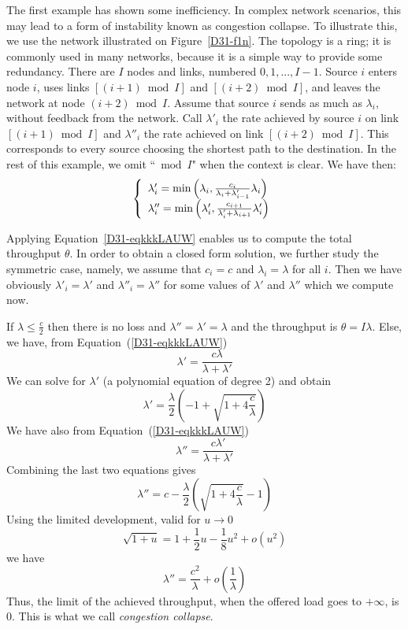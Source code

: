 The first example has shown some inefficiency. In complex
network scenarios, this may lead to a form of instability
known as congestion collapse. To illustrate this, we use the
network illustrated on Figure~\ref{D31-f1n}. The topology is a
ring; it is commonly used in many networks, because it is a
simple way to provide some redundancy. There are $I$ nodes and
links, numbered $0, 1, ..., I-1$. Source $i$ enters node $i$,
uses links $[(i+1) \bmod I] $ and $[(i+2) \bmod I]$, and
leaves the network at node $(i+2) \bmod I$. Assume that source
$i$ sends as much as $\lambda_{i}$, without feedback from the
network. Call $\lambda'_{i}$ the rate achieved by source $i$
on link $[(i+1) \bmod I]$ and $\lambda''_{i}$ the rate
achieved on link $[(i+2) \bmod I]$. This corresponds to every
source choosing the shortest path to the destination. In the
rest of this example, we omit ``$\bmod I$" when the context is
clear. We have then:
\begin{equation}
 \left \{
  \begin{array}{l}
  \lambda'_i = \min
     \left(\lambda_i, \frac{c_i}{\lambda_i +
     \lambda'_{i-1}}\lambda_i
     \right) \\
  \lambda''_i = \min
     \left(\lambda'_i, \frac{c_{i+1}}{\lambda'_i +
     \lambda_{i+1}}\lambda'_i
     \right) \\
  \end{array}
  \right.
    \mylabel{D31-eqkkkLAUW}
\end{equation}

\begin{figure}[htbp]
\end{figure}


Applying Equation~\ref{D31-eqkkkLAUW} enables us to compute
the total throughput $\theta$. In order to obtain a closed
form solution, we further study the symmetric case, namely, we
assume that $c_i=c$ and $\lambda_i= \lambda$ for all $i$. Then
we have obviously $\lambda'_i= \lambda'$ and $\lambda''_i=
\lambda''$ for some values of $\lambda'$ and $\lambda''$ which
we compute now.

If $\lambda \leq \frac{c}{2}$ then there is no loss and
$\lambda''=\lambda'=\lambda$ and the throughput is $\theta = I
\lambda$. Else, we have, from Equation~(\ref{D31-eqkkkLAUW})
$$
 \lambda' = \frac{c \lambda}{\lambda + \lambda'}
$$
We can solve for $\lambda'$ (a polynomial equation of degree
2) and obtain
$$
\lambda'=\frac{\lambda}{2} \left( -1 + \sqrt{1 + 4
\frac{c}{\lambda}}\right)
$$
We have also from Equation~(\ref{D31-eqkkkLAUW})
$$
 \lambda'' = \frac{c \lambda'}{\lambda + \lambda'}
$$
Combining the last two equations gives
$$ \lambda'' = c -\frac{\lambda}{2}\left( \sqrt{1 + 4 \frac{c}{\lambda}} -1 \right)
$$
Using the limited development, valid for $u \rightarrow 0$
 $$\sqrt{1+u} = 1 + \frac{1}{2}u - \frac{1}{8}u^2 + o(u^2)$$we have
 $$  \lambda'' = \frac{c^2}{\lambda} + o(\frac{1}{\lambda})$$
Thus, the limit of the achieved throughput, when the offered
load goes to $+\infty$, is $0$. This is what we call
\emph{congestion collapse}.

